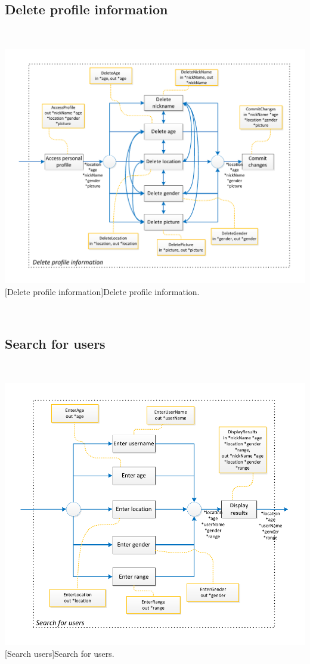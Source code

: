 \documentclass[11pt, a4paper,svglistings,oneside]{book}
\begin{document}
\subsection{Delete profile information}

$\;$ \\
\noindent\begin{minipage}{\textwidth}
    \centering
   \includegraphics[scale=1]{nav_DeleteProfileInformation.pdf}
 [Delete profile information]{Delete profile information.}
\end{minipage}
$\;$ \\ 

\subsection{Search for users}

$\;$ \\
\noindent\begin{minipage}{\textwidth}
    \centering
   \includegraphics[scale=1]{nav_SearchUsers.pdf}
 [Search users]{Search for users.}
\end{minipage}
$\;$ \\ 
\end{document}
